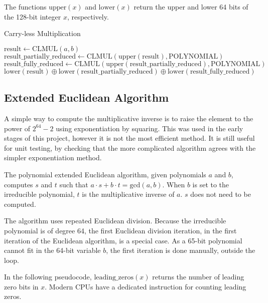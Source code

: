 The functions $\text{upper}(x)$ and $\text{lower}(x)$ return the upper and lower 64 bits of the 128-bit integer $x$, respectively.

\begin{algorithm}
\caption{Carry-less Multiplication}
\begin{algorithmic}
\State $\text{result} \gets \text{CLMUL}(a, b)$
\State $\text{result\_partially\_reduced} \gets \text{CLMUL}(\text{upper}(\text{result}), \text{POLYNOMIAL})$
\State $\text{result\_fully\_reduced} \gets \text{CLMUL}(\text{upper}(\text{result\_partially\_reduced}), \text{POLYNOMIAL})$
\State \Return $\text{lower}(\text{result}) \oplus \text{lower}(\text{result\_partially\_reduced}) \oplus \text{lower}(\text{result\_fully\_reduced})$
\EndFunction
\end{algorithmic}
\end{algorithm}

\subsection{Extended Euclidean Algorithm}

A simple way to compute the multiplicative inverse is to raise the element to the power of $2^{64} - 2$ using exponentiation by squaring.
This was used in the early stages of this project, however it is not the most efficient method.
It is still useful for unit testing, by checking that the more complicated algorithm agrees with the simpler exponentiation method.

The polynomial extended Euclidean algorithm, given polynomials $a$ and $b$, computes $s$ and $t$ such that $a \cdot s + b \cdot t = \text{gcd}(a, b)$.
When $b$ is set to the irreducible polynomial, $t$ is the multiplicative inverse of $a$. $s$ does not need to be computed.

The algorithm uses repeated Euclidean division.
Because the irreducible polynomial is of degree 64, the first Euclidean division iteration, in the first iteration of the Euclidean algorithm, is a special case.
As a 65-bit polynomial cannot fit in the 64-bit variable $b$, the first iteration is done manually, outside the loop.

In the following pseudocode, $\text{leading\_zeros}(x)$ returns the number of leading zero bits in $x$.
Modern CPUs have a dedicated instruction for counting leading zeros.

